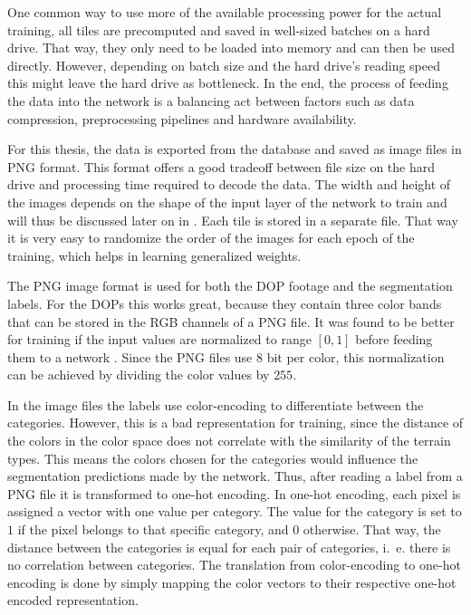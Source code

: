 One common way to use more of the available processing power for the actual training, all tiles are precomputed and saved in well-sized batches on a hard drive. That way, they only need to be loaded into memory and can then be used directly. However, depending on batch size and the hard drive's reading speed this might leave the hard drive as bottleneck. In the end, the process of feeding the data into the network is a balancing act between factors such as data compression, preprocessing pipelines and hardware availability.

For this thesis, the data is exported from the database and saved as image files in PNG format. This format offers a good tradeoff between file size on the hard drive and processing time required to decode the data. The width and height of the images depends on the shape of the input layer of the network to train and will thus be discussed later on in . Each tile is stored in a separate file. That way it is very easy to randomize the order of the images for each epoch of the training, which helps in learning generalized weights.

The PNG image format is used for both the DOP footage and the segmentation labels. For the DOPs this works great, because they contain three color bands that can be stored in the RGB channels of a PNG file. It was found to be better for training if the input values are normalized to range $[0, 1]$ before feeding them to a network . Since the PNG files use 8 bit per color, this normalization can be achieved by dividing the color values by $255$.

In the image files the labels use color-encoding to differentiate between the categories. However, this is a bad representation for training, since the distance of the colors in the color space does not correlate with the similarity of the terrain types. This means the colors chosen for the categories would influence the segmentation predictions made by the network. Thus, after reading a label from a PNG file it is transformed to one-hot encoding. In one-hot encoding, each pixel is assigned a vector with one value per category. The value for the category is set to $1$ if the pixel belongs to that specific category, and $0$ otherwise. That way, the distance between the categories is equal for each pair of categories, i.~e. there is no correlation between categories. The translation from color-encoding to one-hot encoding is done by simply mapping the color vectors to their respective one-hot encoded representation.

